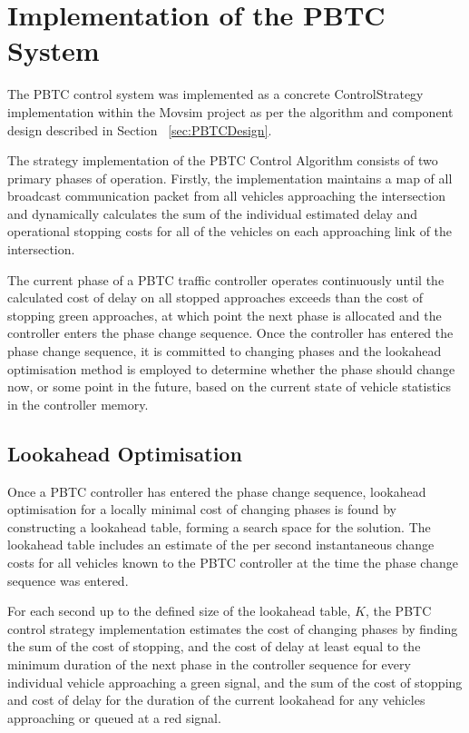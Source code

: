 \section{Implementation of the PBTC System}

The PBTC control system was implemented as a concrete ControlStrategy implementation within the Movsim project as per the algorithm and component design described in Section ~\ref{sec:PBTCDesign}.

The strategy implementation of the PBTC Control Algorithm consists of two primary phases of operation. Firstly, the implementation maintains a map of all broadcast communication packet from all vehicles approaching the intersection and dynamically calculates the sum of the individual estimated delay and operational stopping costs for all of the vehicles on each approaching link of the intersection.

The current phase of a PBTC traffic controller operates continuously until the calculated cost of delay on all stopped approaches exceeds than the cost of stopping green approaches, at which point the next phase is allocated and the controller enters the phase change sequence. Once the controller has entered the phase change sequence, it is  committed to changing phases and the lookahead optimisation method is employed to determine whether the phase should change now, or some point in the future, based on the current state of vehicle statistics in the controller memory. 

\subsection{Lookahead Optimisation}

Once a PBTC controller has entered the phase change sequence, lookahead optimisation for a locally minimal cost of changing phases is found by constructing a lookahead table, forming a search space for the solution. The lookahead table includes an estimate of the  per second instantaneous change costs for all vehicles known to the PBTC controller at the time the phase change sequence was entered. 

For each second up to the defined size of the lookahead table, $K$, the PBTC control strategy implementation estimates the cost of changing phases by finding the sum of the cost of stopping, and the cost of delay at least equal to the minimum duration of the next phase in the controller sequence for every individual vehicle approaching a green signal, and the sum of the cost of stopping and cost of delay for the duration of the current lookahead for any vehicles approaching or queued at a red signal. 

